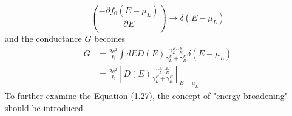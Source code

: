 \begin{equation}
    \left(\frac{-\partial f_{0}\left(E - \mu_L \right)}{\partial E}\right) \rightarrow \delta\left(E-\mu_{L}\right)
\end{equation} and the conductance $G$ becomes 
\begin{align}
    G& = \frac{2e^{2}}{\hbar}\int dE D\left(E\right) \frac{\gamma^E_{L}\gamma^E_{R}}{\gamma^E_{L}+\gamma^E_{R}}\delta\left(E-\mu_{L}\right)\nonumber\\
    &= \frac{2e^{2}}{\hbar}\left[D\left(E\right)\frac{\gamma^E_{L}\gamma^E_{R}}{\gamma^E_{L}+\gamma^E_{R}}\right]_{E = \mu_L}
\end{align} 
To further examine the Equation (1.27), the concept of "energy broadening" should be introduced.

